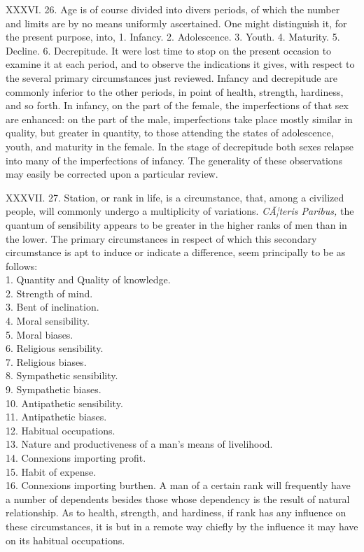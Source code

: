 \documentclass[12pt]{report}
\begin{document}
XXXVI. 26. Age is of course divided into divers periods, of which the
number and limits are by no means uniformly ascertained. One might
distinguish it, for the present purpose, into, 1. Infancy. 2.
Adolescence. 3. Youth. 4. Maturity. 5. Decline. 6. Decrepitude. It were
lost time to stop on the present occasion to examine it at each period,
and to observe the indications it gives, with respect to the several
primary circumstances just reviewed. Infancy and decrepitude are
commonly inferior to the other periods, in point of health, strength,
hardiness, and so forth. In infancy, on the part of the female, the
imperfections of that sex are enhanced: on the part of the male,
imperfections take place mostly similar in quality, but greater in
quantity, to those attending the states of adolescence, youth, and
maturity in the female. In the stage of decrepitude both sexes relapse
into many of the imperfections of infancy. The generality of these
observations may easily be corrected upon a particular review.

XXXVII. 27. Station, or rank in life, is a circumstance, that, among a
civilized people, will commonly undergo a multiplicity of variations.
\emph{CÃ¦teris Paribus,} the quantum of sensibility appears to be
greater in the higher ranks of men than in the lower. The primary
circumstances in respect of which this secondary circumstance is apt to
induce or indicate a difference, seem principally to be as follows:\\
1. Quantity and Quality of knowledge.\\
2. Strength of mind.\\
3. Bent of inclination.\\
4. Moral sensibility.\\
5. Moral biases.\\
6. Religious sensibility.\\
7. Religious biases.\\
8. Sympathetic sensibility.\\
9. Sympathetic biases.\\
10. Antipathetic sensibility.\\
11. Antipathetic biases.\\
12. Habitual occupations.\\
13. Nature and productiveness of a man's means of livelihood.\\
14. Connexions importing profit.\\
15. Habit of expense.\\
16. Connexions importing burthen. A man of a certain rank will
frequently have a number of dependents besides those whose dependency is
the result of natural relationship. As to health, strength, and
hardiness, if rank has any influence on these circumstances, it is but
in a remote way chiefly by the influence it may have on its habitual
occupations.
\end{document}
